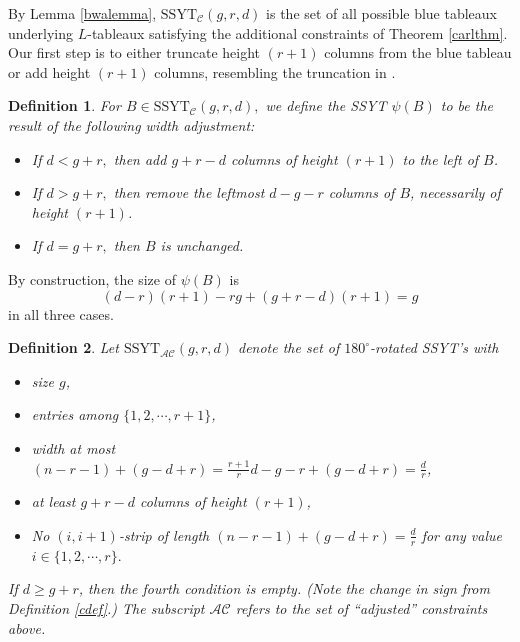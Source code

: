\documentclass[12pt]{amsart}
\newtheorem{definition}{Definition}[section]
\begin{document}
By Lemma \ref{bwalemma}, $\text{SSYT}_\mathcal{C}(g,r,d)$ is the set of all possible blue tableaux underlying $L$-tableaux satisfying the additional constraints of Theorem \ref{carlthm}. Our first step is to either truncate height $(r+1)$ columns from the blue tableau or add height $(r+1)$ columns, resembling the truncation in \cite[Lemma 3.4]{GenRSK}.

\begin{definition}\label{widthadjust}
    For $B\in\text{SSYT}_{\mathcal{C}}(g,r,d),$ we define the SSYT $\psi(B)$ to be the result of the following \emph{width adjustment}:
\begin{itemize}
\item If $d<g+r,$ then add $g+r-d$ columns of height $(r+1)$ to the left of $B$.
\item If $d>g+r,$ then remove the leftmost $d-g-r$ columns of $B$, necessarily of height $(r+1)$.
\item If $d=g+r,$ then $B$ is unchanged.
\end{itemize}

\end{definition}

By construction, the size of $\psi(B)$ is
\begin{equation*}
    (d-r)(r+1)-rg+(g+r-d)(r+1)=g
\end{equation*}
in all three cases.





\begin{definition}\label{ACdef}
    Let $\text{SSYT}_{\mathcal{AC}}(g,r,d)$ denote the set of $180^\circ$-rotated SSYT's with 
    \begin{itemize}
    \item  size $g$, 
    \item  entries among $\{1,2,\cdots, r+1\}$,
    \item  width at most $(n-r-1)+(g-d+r)=\frac{r+1}{r}d-g-r+(g-d+r)=\frac{d}{r}$,
    \item  at least $g+r-d$ columns of height $(r+1)$,
    \item  No $(i,i+1)$-strip of length $(n-r-1)+(g-d+r)=\frac{d}{r}$ for any value $i\in \{1,2,\cdots, r\}.$
    \end{itemize}
If $d\ge g+r$, then the fourth condition is empty. (Note the change in sign from Definition \ref{cdef}.) The subscript $\mathcal{AC}$ refers to the set of ``adjusted'' constraints above.
\end{definition}
\end{document}
